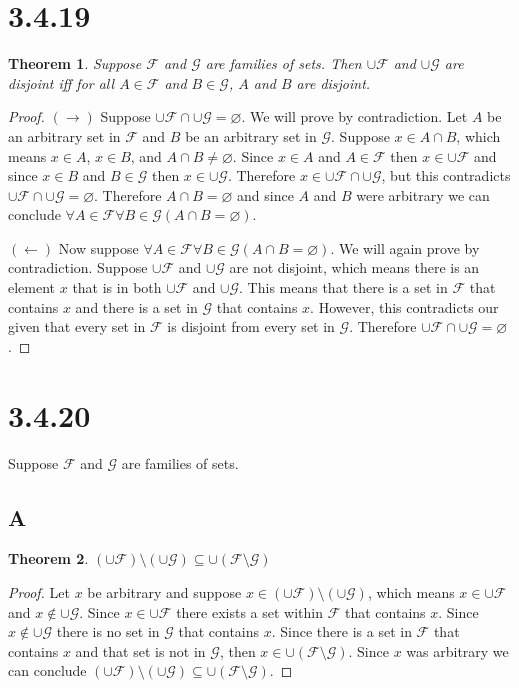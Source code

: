 \documentclass{article}
\newcommand{\F}{\mathcal{F}}
\newcommand{\G}{\mathcal{G}}
\newtheorem*{theorem}{Theorem}  %
\begin{document}
\section*{3.4.19}

\begin{theorem} Suppose $\F$ and $\G$ are families of sets. Then $\cup \F$ and $\cup \G$ are disjoint iff for all $A \in \F$ and $B \in \G$, $A$ and $B$ are disjoint.
\end{theorem}

\begin{proof}
$(\rightarrow)$ Suppose $\cup \F \cap \cup \G = \varnothing$. We will prove by contradiction. Let $A$ be an arbitrary set in $\F$ and $B$ be an arbitrary set in $\G$. Suppose $x \in A \cap B$, which means $x \in A$, $x \in B$, and $A \cap B \neq \varnothing$. Since $x \in A$ and $A \in \F$ then $x \in \cup \F$ and since $x \in B$ and $B \in \G$ then $x \in \cup \G$. Therefore $x \in \cup \F \cap \cup \G$, but this contradicts $\cup \F \cap \cup \G = \varnothing$. Therefore $A \cap B = \varnothing$ and since $A$ and $B$ were arbitrary we can conclude $\forall A \in \F \forall B \in \G (A \cap B = \varnothing)$.

$(\leftarrow)$ Now suppose $\forall A \in \F \forall B \in \G (A \cap B = \varnothing)$. We will again prove by contradiction. Suppose $\cup \F$ and $\cup \G$ are not disjoint, which means there is an element $x$ that is in both $\cup \F$ and $\cup \G$. This means that there is a set in $\F$ that contains $x$ and there is a set in $\G$ that contains $x$. However, this contradicts our given that every set in $\F$ is disjoint from every set in $\G$. Therefore $\cup \F \cap \cup \G = \varnothing$.
\end{proof}

\section*{3.4.20}
Suppose $\F$ and $\G$ are families of sets.
\subsection*{A}
\begin{theorem} $(\cup \F) \setminus (\cup \G) \subseteq \cup(\F \setminus \G)$
\end{theorem}
\begin{proof}
Let $x$ be arbitrary and suppose $x \in (\cup \F) \setminus (\cup \G)$, which means $x \in \cup \F$ and $x \notin \cup \G$. Since $x \in \cup \F$ there exists a set within $\F$ that contains $x$. Since $x \notin \cup \G$ there is no set in $\G$ that contains $x$. Since there is a set in $\F$ that contains $x$ and that set is not in $\G$, then $x \in \cup (\F \setminus \G)$. Since $x$ was arbitrary we can conclude $(\cup \F) \setminus (\cup \G) \subseteq \cup (\F \setminus \G)$.
\end{proof}
\end{document}
